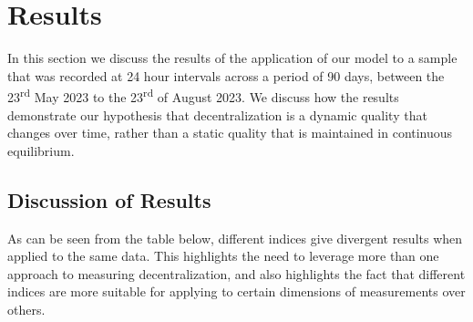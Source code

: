 \documentclass[conference]{IEEEtran}
\begin{document}
\section{Results}

In this section we discuss the results of the application of our model to a sample that was recorded at 24 hour intervals across a period of 90 days, between the 23\textsuperscript{rd} May 2023 to the 23\textsuperscript{rd} of August 2023.  We discuss how the results demonstrate our hypothesis that decentralization is a dynamic quality that changes over time, rather than a static quality that is maintained in continuous equilibrium.

\subsection{Discussion of Results}

As can be seen from the table below, different indices give divergent results when applied to the same data.  This highlights the need to leverage more than one approach to measuring decentralization, and also highlights the fact that different indices are more suitable for applying to certain dimensions of measurements over others.
\end{document}
